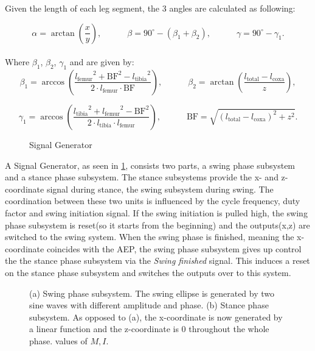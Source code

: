  Given the length of each leg segment, the 3 angles are calculated as following:

\[
	\alpha = \arctan(\frac{x}{y}) ,\quad \quad \quad \beta = 90^{\circ} - (\beta_1 + \beta_2) ,\quad \quad \quad \gamma = 90^{\circ} - \gamma_1.
\]
\\
Where $\beta_1$, $\beta_2$, $\gamma_1$ and  are given by:
\[	
	\beta_1 = \arccos(\frac{{l_\text{femur}}^2 + \text{BF}^2 - {l_\text{tibia}}^2}  {2\cdot l_\text{femur} \cdot \text{BF}}) ,\quad \quad \quad \beta_2 = \arctan(\frac{ l_\text{total} - l_\text{coxa}} {z}),
\]

\[
	\gamma_1 = \arccos(\frac{{l_\text{tibia}}^2 + {l_\text{femur}}^2 - {\text{BF}}^2}  {2 \cdot {l_\text{tibia}} \cdot {l_\text{femur}}}) ,\quad \quad \quad \text{BF} = \sqrt{(l_\text{total} - l_\text{coxa})^2 + z^2}.
\]








\begin{figure}[h]
	\centerline{}
	\caption{Signal Generator}
	\label{figure: Signal Generator}
\end{figure}

A Signal Generator, as seen in \ref{figure: Signal Generator}, consists two parts, a swing phase subsystem and a stance phase subsystem.
The stance subsystems provide the x- and z-coordinate signal during stance, the swing subsystem during swing.
The coordination between these two units is influenced by the cycle frequency, duty factor and swing initiation signal.
If the swing initiation is pulled high, the swing phase subsystem is reset(so it starts from the beginning) and the outputs(x,z) are switched to the swing system.
When the swing phase is finished, meaning the x-coordinate coincides with the AEP, the swing phase subsystem gives up control the the stance phase subsystem via the \textit{Swing finished} signal.
This induces a reset on the stance phase subsystem and switches the outputs over to this system.

\begin{figure}
	\centering
	\begin{subfigure}[b]{0.55\textwidth}
		
		\caption{}
		\label{fig:Ng1} 
	\end{subfigure}
	
	\begin{subfigure}[b]{0.55\textwidth}
		
		\caption{}
		\label{fig:Ng2}
	\end{subfigure}
	
	\caption[Swing and Stance Phase]{(a) Swing phase subsystem. The swing ellipse is generated by two sine waves with different amplitude and phase. (b) Stance phase subsystem. As opposed to (a), the x-coordinate is now generated by a linear function and the z-coordinate is 0 throughout the whole phase.
		values of $M,I$.}
\end{figure}




